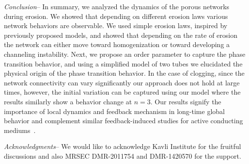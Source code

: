 \documentclass[%
 reprint,
 amsmath,amssymb,
 aps,
]{revtex4-1}
\newcommand{\add}[1]{\noindent \color{blue} #1 \normalcolor}
\begin{document}
%
\textit{Conclusion}-- In summary, we analyzed the dynamics of the porous networks during erosion. We showed that depending on different erosion laws various network behaviors are observable. We used simple erosion laws, inspired by previously proposed models, and showed that depending on the rate of erosion the network can either move toward homogenization or toward developing a channeling instability. Next, we propose an order parameter to capture the phase transition behavior, and using a simplified model of two tubes we elucidated the physical origin of the phase transition behavior. 
In the case of clogging, since the network connectivity can vary significantly our approach does not hold at large times, however, the initial variation can be captured using our model where the results similarly show a behavior change at $n=3$. Our results signify the importance of local dynamics and feedback mechanism in long-time global behavior and complement similar feedback-induced studies for active conducting mediums~\cite{ocko2015feedback}. 


\textit{Acknowledgments}-- We would like to acknowledge Kavli Institute for the fruitful discussions and also MRSEC  DMR-2011754 and DMR-1420570 for the support. 
















\appendix
\end{document}
